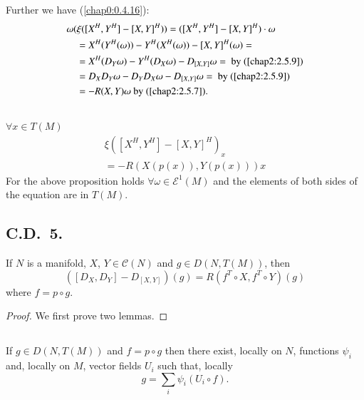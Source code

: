 Further \pageoriginale we have (\ref{chap0:0.4.16}):
\begin{align*}
& \omega(\xi([X^{H},Y^{H}]-[X,Y]^{H}))=([X^{H},Y^{H}]-[X,Y]^{H})\cdot\omega\\
&\quad =X^{H}(Y^{H}(\omega))-Y^{H}(X^{H}(\omega))-[X,Y]^{H}(\omega)=\\
&\quad =X^{H}(D_{Y}\omega)-Y^{H}(D_{X}\omega)-D_{[X,Y]}\omega=\text{ by (\ref{chap2:2.5.9})}\\ 
&\quad =D_{X}D_{Y}\omega-D_{Y}D_{X}\omega-D_{[X,Y]}\omega=\text{ by (\ref{chap2:2.5.9})}\\
&\quad =-R(X,Y)\omega\text{ by (\ref{chap2:2.5.7})}.
\end{align*}

\subsection{}\label{chap2:2.5.11}

\begin{coro*}
$\forall x\in T(M)$
\begin{gather*}
\xi([X^{H},Y^{H}]-[X,Y]^{H})_{x}\\
=-R(X(p(x)),Y(p(x)))x
\end{gather*}
For the above proposition holds $\forall \omega\in\mathscr{E}^{1}(M)$
and the elements of both sides of the equation are in
$T(M)$. 
\end{coro*} 

\setcounter{subsection}{11}
\subsection{C.D.~5.}\label{chap2:2.5.12}
If $N$ is a manifold, $X$, $Y\in\mathscr{C}(N)$ and $g\in D(N,T(M))$, then
$$
([D_{X},D_{Y}]-D_{[X,Y]})(g)=R(f^{T}\circ X, f^{T}\circ Y)(g)
$$
where $f=p\circ g$.

\begin{proof}
We first prove two lemmas.
\end{proof}


\setcounter{subsection}{12}
\subsection{}\label{chap2:2.5.13} 

\begin{lemma*}
If $g\in D(N,T(M))$ and $f=p\circ g$ then there exist, locally on $N$, functions $\psi_{i}$ and, locally on $M$, vector fields $U_{i}$ such that, locally
$$
g=\sum_{i}\psi_{i}(U_{i}\circ f).
$$\pageoriginale
\end{lemma*}

